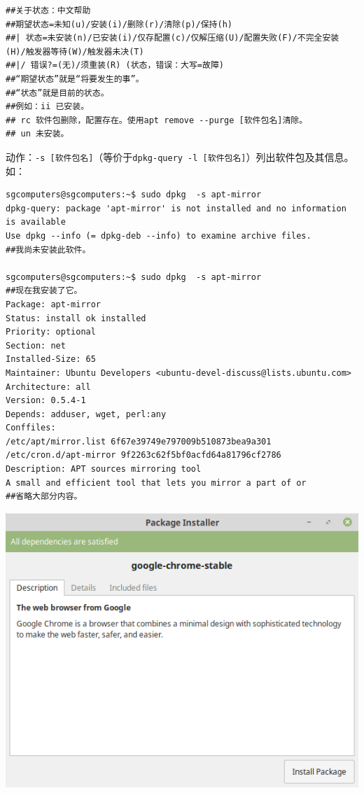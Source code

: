 \begin{verbatim}
##关于状态：中文帮助
##期望状态=未知(u)/安装(i)/删除(r)/清除(p)/保持(h)
##| 状态=未安装(n)/已安装(i)/仅存配置(c)/仅解压缩(U)/配置失败(F)/不完全安装(H)/触发器等待(W)/触发器未决(T)
##|/ 错误?=(无)/须重装(R) (状态，错误：大写=故障)
##“期望状态”就是“将要发生的事”。
##“状态”就是目前的状态。
##例如：ii 已安装。
## rc 软件包删除，配置存在。使用apt remove --purge [软件包名]清除。
## un 未安装。
\end{verbatim} \par

动作：\verb|-s [软件包名]|（等价于\verb|dpkg-query -l [软件包名]|）列出软件包及其信息。如：
\begin{verbatim}
sgcomputers@sgcomputers:~$ sudo dpkg  -s apt-mirror
dpkg-query: package 'apt-mirror' is not installed and no information is available
Use dpkg --info (= dpkg-deb --info) to examine archive files.
##我尚未安装此软件。

sgcomputers@sgcomputers:~$ sudo dpkg  -s apt-mirror
##现在我安装了它。
Package: apt-mirror
Status: install ok installed
Priority: optional
Section: net
Installed-Size: 65
Maintainer: Ubuntu Developers <ubuntu-devel-discuss@lists.ubuntu.com>
Architecture: all
Version: 0.5.4-1
Depends: adduser, wget, perl:any
Conffiles:
/etc/apt/mirror.list 6f67e39749e797009b510873bea9a301
/etc/cron.d/apt-mirror 9f2263c62f5bf0acfd64a81796cf2786
Description: APT sources mirroring tool
A small and efficient tool that lets you mirror a part of or
##省略大部分内容。
\end{verbatim}
\begin{center}
	\includegraphics[scale=0.4]{pic/gdebi.png}
\end{center}
